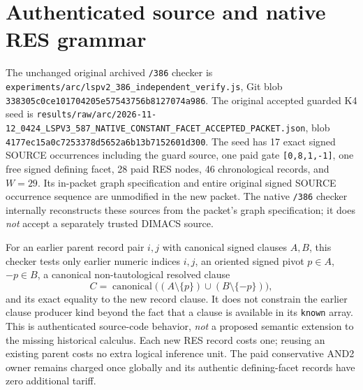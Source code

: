 \documentclass[11pt]{article}
\begin{document}
\section*{Authenticated source and native RES grammar}
The unchanged original archived \texttt{/386} checker is \texttt{experiments/arc/lspv2\_386\_independent\_verify.js}, Git blob
\texttt{338305c0ce101704205e57543756b8127074a986}. The original accepted guarded K4 seed is
\texttt{results/raw/arc/2026-11-12\_0424\_LSPV3\_587\_NATIVE\_CONSTANT\_FACET\_ACCEPTED\_PACKET.json}, blob \texttt{4177ec15a0c7253378d5652a6b13b7152601d300}.
The seed has 17 exact signed SOURCE occurrences including the guard source, one paid gate \texttt{[0,8,1,-1]}, one free signed defining facet, 28 paid RES nodes, 46 chronological records, and $W=29$. Its in-packet graph specification and entire original signed SOURCE occurrence sequence are unmodified in the new packet. The native \texttt{/386} checker internally reconstructs these sources from the packet's graph specification; it does \emph{not} accept a separately trusted DIMACS source.

For an earlier parent record pair $i,j$ with canonical signed clauses $A,B$, this checker tests only earlier numeric indices $i,j$, an oriented signed pivot $p\in A$, $-p\in B$, a canonical non-tautological resolved clause
\[
 C=\operatorname{canonical}\big((A\setminus\{p\})\cup(B\setminus\{-p\})\big),
\]
and its exact equality to the new record clause. It does not constrain the earlier clause producer kind beyond the fact that a clause is available in its \texttt{known} array. This is authenticated source-code behavior, \emph{not} a proposed semantic extension to the missing historical calculus. Each new RES record costs one; reusing an existing parent costs no extra logical inference unit. The paid conservative AND2 owner remains charged once globally and its authentic defining-facet records have zero additional tariff.
\end{document}
